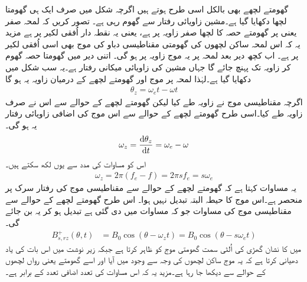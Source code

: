 گھومتے لچھے بھی بالکل اسی طرح ہوتے ہیں اگرچہ شکل میں صرف ایک ہی گھومتا لچھا دکھایا گیا ہے۔مشین  زاویائی رفتار سے گھوم رہی ہے۔ تصور کریں کہ لمحہ صفر یعنی  پر گھومتے حصہ کا   لچھا صفر زاویہ پر ہے، یعنی یہ نقطہ دار اُفقی لکیر پر ہے مزید یہ کہ اس لمحہ ساکن لچھوں کی گھومتی مقناطیسی دباو کی موج بھی اسی اُفقی لکیر پر ہے۔ اب کچھ دیر بعد لمحہ  پر یہ موج زاویہ   پر ہو گی۔ اتنی دیر میں گھومتا حصہ گھوم کر زاویہ   تک پہنچ جائے گا جہاں   مشین کی زاویائی میکانی رفتار ہے۔یہ سب شکل میں دکھایا گیا ہے۔لہٰذا لمحہ  پر موج اور گھومتے لچھے کے درمیان زاویہ  یہ ہو گا
\begin{align}
\theta_z=\omega_e t -\omega t
\end{align}
اگرچہ مقناطیسی موج نے  زاویہ طے کیا لیکن گھومتے لچھے کے حوالے سے اس نے صرف  زاویہ  طے کیا۔اسی طرح گھومتے لچھے کے حوالے سے اس موج کی  اضافی زاویائی رفتار  یہ ہو گی۔
\begin{align}
\omega_z=\frac{\dif \theta_z}{\dif t}=\omega_e -\omega
\end{align}
اس کو مساوات  کی مدد سے یوں لکھ سکتے ہیں۔
\begin{align}
\omega_z=2 \pi (f_e-f)=2 \pi s f_e = s \omega_e
\end{align}
یہ مساوات کہتا ہے کہ گھومتے لچھے کے حوالے سے مقناطیسی موج کی رفتار سرک  پر منحصر ہے۔اس موج کا حیطہ البتہ تبدیل نہیں ہوا۔ اس طرح گھومتے لچھے کے حوالے سے مقناطیسی موج کی مساوات جو کہ مساوات   میں دی گئی ہے تبدیل ہو کر یہ بن جائے گی۔
\begin{align}
B_{s,rz}^+(\theta,t)&=B_0 \cos (\theta-\omega_z t)=B_0 \cos (\theta -s \omega_e t)
\end{align}
 میں  کا نشان  گھڑی کی اُلٹی سمت گھومتی موج کو ظاہر کرتا ہے جبکہ  زیر نوشت میں    اس بات کی یاد دھیانی کرتا ہے کہ یہ موج ساکن لچھوں کی وجہ سے وجود میں آیا اور اسے گھومتے یعنی رواں لچھوں کے حوالے سے دیکھا جا رہا ہے۔مزید یہ کہ اس مساوات کی تعدد اضافی تعدد  کے برابر ہے۔

